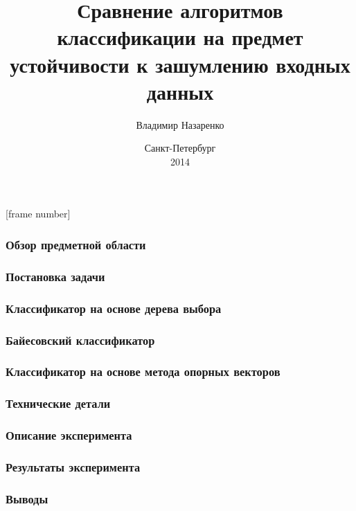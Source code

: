 \documentclass{beamer}
\begin{document}

\title[Сравнение алгоритмов классификации]{Сравнение алгоритмов классификации на предмет устойчивости к зашумлению входных данных}
\author{Владимир Назаренко}
\date{Санкт-Петербург\\ 2014}
\subject{Алгоритмы классификации}


\frame{\titlepage}
[frame number]

\begin{frame}
    \frametitle{Обзор предметной области}
  \end{frame}
  
  \begin{frame}
    \frametitle{Постановка задачи}
  \end{frame}
  
  \begin{frame}
    \frametitle{Классификатор на основе дерева выбора}
  \end{frame}
  
  \begin{frame}
    \frametitle{Байесовский классификатор}
  \end{frame}
  
  \begin{frame}
    \frametitle{Классификатор на основе метода опорных векторов}
  \end{frame}
  
  \begin{frame}
  	\frametitle{Технические детали}
  \end{frame}
  
  \begin{frame}
    \frametitle{Описание эксперимента}
  \end{frame}
  
  \begin{frame}
    \frametitle{Результаты эксперимента}
  \end{frame}
  
  \begin{frame}
    \frametitle{Выводы}
  \end{frame}
  
\end{document}
